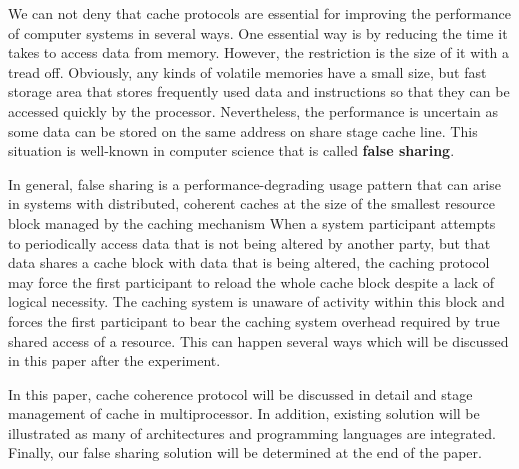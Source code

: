 \par We can not deny that cache protocols are essential for improving the performance of computer systems in several ways. One essential way is by reducing 
the time it takes to access data from memory. However, the restriction is the size of it with a tread off.
Obviously, any kinds of volatile memories have a small size, but fast storage area that stores frequently used data and instructions so that they can be 
accessed quickly by the processor. Nevertheless, the performance is uncertain as some data can be stored on the same address on share stage cache line.
This situation is well-known in computer science that is called \textbf{false sharing}.

\par In general, false sharing is a performance-degrading usage pattern  that can arise in systems with distributed, coherent caches at the size of the smallest 
resource block managed by the caching mechanism When a system participant attempts to periodically access data that is not being altered by another party, but that 
data shares a cache block with data that is being altered, the caching protocol may force the first participant to reload the whole cache block despite a lack of logical necessity.
The caching system is unaware of activity within this block and forces the first participant to bear the caching system overhead required by true shared access of a resource.
This can happen several ways which will be discussed in this paper after the experiment.

In this paper, cache coherence protocol will be discussed in detail and stage management of cache in multiprocessor.
In addition, existing solution will be illustrated as many of architectures and programming languages are integrated. Finally, our false sharing 
solution will be determined at the end of the paper.
